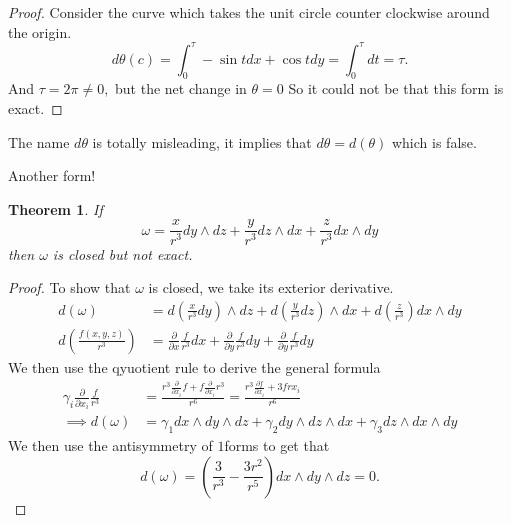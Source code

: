 \documentclass[letter]{article}
\newtheorem{theorem}{Theorem}
\newenvironment{menumerate}{%
  \edef\backupindent{\the\parindent}%
  \enumerate%
  \setlength{\parindent}{\backupindent}%
}{\endenumerate}
\begin{document}
\begin{menumerate}
\begin{proof}
	Consider the curve which takes the unit circle counter clockwise around the origin. 
	\begin{equation}
	 d\theta(c)= \int_0^\tau -\sin t dx + \cos t dy = \int_0^\tau dt = \tau.
	\end{equation}
	And $\tau = 2\pi \neq 0,$ but the net change in $\theta = 0$ So it could not be that this form is exact. 
\end{proof}
	The name $d\theta$ is totally misleading, it implies that $d\theta = d(\theta)$ which is false. 

	
\setcounter{enumi}{66}
\item Another form!
\begin{theorem} If
		\begin{equation}
		\omega = \frac{x}{r^3}dy \wedge dz + \frac{y}{r^3}dz \wedge dx + \frac{z}{r^3}dx \wedge dy
		\end{equation}
		then $\omega$ is closed but not exact.
	\end{theorem}	
	\begin{proof}
		To show that $\omega$ is closed, we take its exterior derivative.
		\begin{equation}
			\begin{aligned}
				d(\omega) &= d\left(\frac{x}{r^3}dy\right)    \wedge dz + d\left(\frac{y}{r^3}dz\right)    \wedge dx   + d\left(\frac{z}{r^3}\right)  dx \wedge dy \\
				d\left(\frac{f(x,y,z)}{r^3}\right) &= \frac{\partial}{\partial x} \frac{f}{r^3} dx+  \frac{\partial}{\partial y} \frac{f}{r^3} dy+  \frac{\partial}{\partial y} \frac{f}{r^3} dy
			\end{aligned}	
		\end{equation}
		We then use the qyuotient rule to derive the general formula
		\begin{equation}
		\begin{aligned}
			\gamma_i \frac{\partial}{\partial x_i} \frac{f}{r^3} &= \frac{r^3 \frac{\partial}{\partial x_i} f +  f\frac{\partial}{\partial x_i} r^3}{r^6} = \frac{r^3 \frac{\partial f }{\partial x_i} + 3 f r x_i }{r^6} \\
			\implies d(\omega) &= \gamma_1 dx \wedge dy \wedge dz + \gamma_2 dy \wedge dz \wedge dx + \gamma_3 dz \wedge dx \wedge dy 
		\end{aligned}	
		\end{equation}
		We then use the antisymmetry of $1$forms to get that
		\begin{equation}
			d(\omega) = \left(\frac{3}{r^3} - \frac{3r^2}{r^5}\right) dx \wedge dy \wedge dz = 0.
		\end{equation}


\end{proof}
\end{menumerate}
\end{document}

